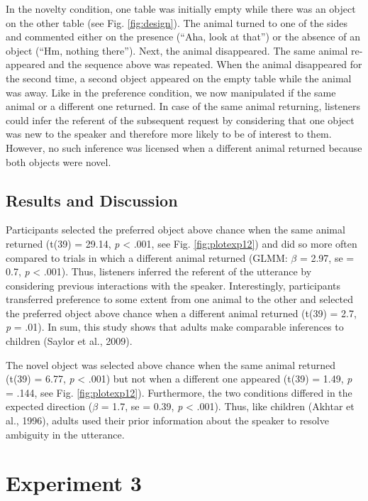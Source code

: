 \documentclass[10pt, letterpaper]{article}
\begin{document}
In the novelty condition, one table was initially empty while there was
an object on the other table (see Fig. \ref{fig:design}). The animal
turned to one of the sides and commented either on the presence (``Aha,
look at that'') or the absence of an object (``Hm, nothing there'').
Next, the animal disappeared. The same animal re-appeared and the
sequence above was repeated. When the animal disappeared for the second
time, a second object appeared on the empty table while the animal was
away. Like in the preference condition, we now manipulated if the same
animal or a different one returned. In case of the same animal
returning, listeners could infer the referent of the subsequent request
by considering that one object was new to the speaker and therefore more
likely to be of interest to them. However, no such inference was
licensed when a different animal returned because both objects were
novel.

\subsection{Results and Discussion}\label{results-and-discussion-1}

Participants selected the preferred object above chance when the same
animal returned (t(39) = 29.14, \emph{p} \textless{} .001, see Fig.
\ref{fig:plotexp12}) and did so more often compared to trials in which a
different animal returned (GLMM: \(\beta\) = 2.97, se = 0.7, \emph{p}
\textless{} .001). Thus, listeners inferred the referent of the
utterance by considering previous interactions with the speaker.
Interestingly, participants transferred preference to some extent from
one animal to the other and selected the preferred object above chance
when a different animal returned (t(39) = 2.7, \emph{p} = .01). In sum,
this study shows that adults make comparable inferences to children
(Saylor et al., 2009).

The novel object was selected above chance when the same animal returned
(t(39) = 6.77, \emph{p} \textless{} .001) but not when a different one
appeared (t(39) = 1.49, \emph{p} = .144, see Fig. \ref{fig:plotexp12}).
Furthermore, the two conditions differed in the expected direction
(\(\beta\) = 1.7, se = 0.39, \emph{p} \textless{} .001). Thus, like
children (Akhtar et al., 1996), adults used their prior information
about the speaker to resolve ambiguity in the utterance.

\section{Experiment 3}\label{experiment-3}
\end{document}
